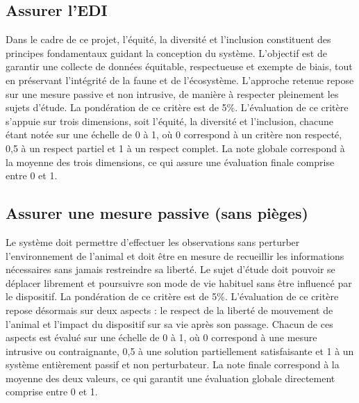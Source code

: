\subsection{Assurer l'EDI}

Dans le cadre de ce projet, l’équité, la diversité et l’inclusion constituent
des principes fondamentaux guidant la conception du système. L’objectif est de
garantir une collecte de données équitable, respectueuse et exempte de biais,
tout en préservant l’intégrité de la faune et de l’écosystème. L’approche
retenue repose sur une mesure passive et non intrusive, de manière à respecter
pleinement les sujets d’étude. La pondération de ce critère est de 5\%.
L’évaluation de ce critère s’appuie sur trois dimensions, soit l’équité, la
diversité et l’inclusion, chacune étant notée sur une échelle de 0 à 1, où 0
correspond à un critère non respecté, 0,5 à un respect partiel et 1 à un
respect complet. La note globale correspond à la moyenne des trois dimensions,
ce qui assure une évaluation finale comprise entre 0 et 1.

\subsection{Assurer une mesure passive (sans pièges)}

Le système doit permettre d’effectuer les observations sans perturber
l’environnement de l’animal et doit être en mesure de recueillir les
informations nécessaires sans jamais restreindre sa liberté. Le sujet d’étude
doit pouvoir se déplacer librement et poursuivre son mode de vie habituel sans
être influencé par le dispositif. La pondération de ce critère est de 5\%.
L’évaluation de ce critère repose désormais sur deux aspects : le respect de la
liberté de mouvement de l’animal et l’impact du dispositif sur sa vie après son
passage. Chacun de ces aspects est évalué sur une échelle de 0 à 1, où 0
correspond à une mesure intrusive ou contraignante, 0,5 à une solution
partiellement satisfaisante et 1 à un système entièrement passif et non
perturbateur. La note finale correspond à la moyenne des deux valeurs, ce qui
garantit une évaluation globale directement comprise entre 0 et 1.
